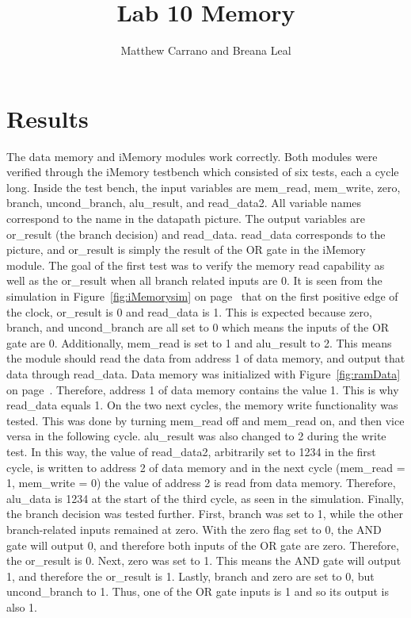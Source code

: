 \documentclass{article}
\author{Matthew Carrano and Breana Leal}
\title{Lab 10 Memory}
\begin{document}
\maketitle

\section{Results}
The data memory and iMemory modules work correctly. Both modules were verified through the iMemory testbench which consisted of six tests, each a cycle long. Inside the test bench, the input variables are mem\_read, mem\_write, zero, branch, uncond\_branch, alu\_result, and read\_data2. All variable names correspond to the name in the datapath picture. The output variables are or\_result (the branch decision) and read\_data. read\_data corresponds to the picture, and or\_result is simply the result of the OR gate in the iMemory module. The goal of the first test was to verify the memory read capability as well as the or\_result when all branch related inputs are 0. It is seen from the simulation in Figure~\ref{fig:iMemorysim} on page~\pageref{fig:iMemorysim} that on the first positive edge of the clock, or\_result is 0 and read\_data is 1. This is expected because zero, branch, and uncond\_branch are all set to 0 which means the inputs of the OR gate are 0. Additionally, mem\_read is set to 1 and alu\_result to 2. This means the module should read the data from address 1 of data memory, and output that data through read\_data. Data memory was initialized with Figure~\ref{fig:ramData} on page~\pageref{fig:ramData}. Therefore, address 1 of data memory contains the value 1. This is why read\_data equals 1. On the two next cycles, the memory write functionality was tested. This was done by turning mem\_read off and mem\_read on, and then vice versa in the following cycle. alu\_result was also changed to 2 during the write test. In this way, the value of read\_data2, arbitrarily set to 1234 in the first cycle, is written to address 2 of data memory and in the next cycle (mem\_read = 1, mem\_write = 0) the value of address 2 is read from data memory. Therefore, alu\_data is 1234 at the start of the third cycle, as seen in the simulation. Finally, the branch decision was tested further. First, branch was set to 1, while the other branch-related inputs remained at zero. With the zero flag set to 0, the AND gate will output 0, and therefore both inputs of the OR gate are zero. Therefore, the or\_result is 0. Next, zero was set to 1. This means the AND gate will output 1, and therefore the or\_result is 1. Lastly, branch and zero are set to 0, but uncond\_branch to 1. Thus, one of the OR gate inputs is 1 and so its output is also 1. 
\end{document}

